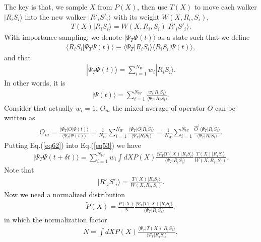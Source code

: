 \documentclass[12pt,letterpaper,UTF8]{report}
\begin{document}
{The key is that, we sample $X$ from $P(X)$, then use $T(X)$ to move each walker $| R_i S_i \rangle$ into the new walker $| R'_i S'_i \rangle$ with its weight $W(X,R_i,S_i)$,
\begin{eqnarray}
T(X) | R_i S_i \rangle = W(X, R_i, S_i) | R'_i S'_i \rangle.
\end{eqnarray}
With importance sampling, we denote $|\Psi_T \Psi(t)\rangle$ as a state such that we define
\begin{eqnarray}
\langle R_i S_i | \Psi_T \Psi(t) \rangle \equiv \langle \Psi_T | R_i S_i \rangle \langle R_i S_i | \Psi(t) \rangle,
\end{eqnarray}
and that
\begin{eqnarray}
| \Psi_T \Psi(t) \rangle = \sum_{i=1}^{N_W} w_i | R_i S_i \rangle.
\end{eqnarray}
In other words, it is
\begin{eqnarray}
| \Psi(t) \rangle = \sum_{i=1}^{N_W} \frac{w_i | R_i S_i \rangle}{ \langle \Psi_T | R_i S_i \rangle   }. \label{eq62}
\end{eqnarray}
Consider that actually $w_i=1$, $O_m$ the mixed average of operator $O$ can be written as
\begin{eqnarray}
O_m = \frac{ \langle \Psi_T | O | \Psi(t) \rangle }{ \langle \Psi_T | \Psi(t) \rangle }
= \frac{1}{N_W} \sum_{i=1}^{N_W} \frac{\langle \Psi_T | O |R_i S_i \rangle  }{\langle \Psi_T | R_i S_i\rangle}
= \frac{1}{N_W} \sum_{i=1}^{N_W} \frac{ \hat{O}^\dag \langle \Psi_T |R_i S_i \rangle  }{\langle \Psi_T | R_i S_i\rangle}.
\end{eqnarray}
Putting Eq.(\ref{eq62}) into Eq.(\ref{eq53}) we have
\begin{eqnarray}
|\Psi_T \Psi(t+\delta t) \rangle = \sum_{i=1}^{N_W} w_i \int dX P(X) \frac{\langle \Psi_T |T(X)|R_i S_i\rangle}{\langle \Psi_T | R_i S_i \rangle}\frac{T(X)| R_i S_i \rangle}{W(X,R_i,S_i)}. \label{eq65}
\end{eqnarray}
Note that
\begin{eqnarray}
|R'_i S'_i \rangle = \frac{T(X)| R_i S_i \rangle}{   W(X,R_i,S_i)}.
\end{eqnarray}
Now we need a normalized distribution
\begin{eqnarray}
\tilde{P}(X)=\frac{P(X)}{N} \frac{\langle \Psi_T |T(X)|R_i S_i\rangle}{\langle \Psi_T | R_i S_i \rangle},
\end{eqnarray}
in which the normalization factor
\begin{eqnarray}
N=\int dX P(X) \frac{\langle \Psi_T|T(X) |R_i S_i \rangle }{\langle \Psi_T | R_i S_i \rangle},

\end{eqnarray}}
\end{document}
